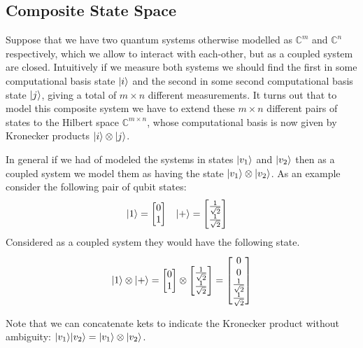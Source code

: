 \subsection{Composite State Space}
Suppose that we have two quantum systems otherwise modelled as $\mathbb{C}^m$ and $\mathbb{C}^n$ respectively, which we allow to interact with each-other, but as a coupled system are closed. Intuitively if we measure both systems we should find the first in some computational basis state $| i \rangle$ and the second in some second computational basis state $| j \rangle$, giving a total of $m \times n$ different measurements. It turns out that to model this composite system we have to extend these $m \times n$ different pairs of states to the Hilbert space $\mathbb{C}^{m \times n}$, whose computational basis is now given by Kronecker products $| i \rangle \otimes | j \rangle$.

In general if we had of modeled the systems in states $| v_1 \rangle$ and $| v_2 \rangle$ then as a coupled system we model them as having the state $| v_1 \rangle \otimes | v_2 \rangle$. As an example consider the following pair of qubit states:
\begin{align*}
| 1 \rangle = \left[\begin{matrix}0\\1\end{matrix}\right]
&&&
| + \rangle = \left[\begin{matrix}\frac{1}{\sqrt{2}}\\\frac{1}{\sqrt{2}}\end{matrix}\right]
\end{align*}
Considered as a coupled system they would have the following state.
\[
| 1 \rangle\otimes | + \rangle = \left[\begin{matrix}0\\1\end{matrix}\right]
\otimes
\left[\begin{matrix}\frac{1}{\sqrt{2}}\\\frac{1}{\sqrt{2}}\end{matrix}\right]
=
\left[\begin{matrix}0\\0\\\frac{1}{\sqrt{2}}\\\frac{1}{\sqrt{2}}\end{matrix}\right]
\]

Note that we can concatenate kets to indicate the Kronecker product without ambiguity: $| v_1 \rangle| v_2 \rangle = | v_1 \rangle\otimes| v_2 \rangle$.

